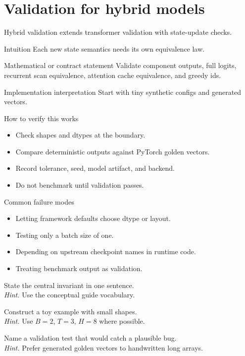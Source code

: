 \chapter{Validation for hybrid models}
\label{ch:hybrid-validation}
Hybrid validation extends transformer validation with state-update checks.



\begin{intuitionbox}{Intuition}
Each new state semantics needs its own equivalence law.
\end{intuitionbox}

\begin{definitionbox}{Mathematical or contract statement}
Validate component outputs, full logits, recurrent scan equivalence, attention cache equivalence, and greedy ids.
\end{definitionbox}

\begin{implementationbox}{Implementation interpretation}
Start with tiny synthetic configs and generated vectors.
\end{implementationbox}

\begin{verificationbox}{How to verify this works}
\begin{itemize}
\item Check shapes and dtypes at the boundary.
\item Compare deterministic outputs against PyTorch golden vectors.
\item Record tolerance, seed, model artifact, and backend.
\item Do not benchmark until validation passes.
\end{itemize}
\end{verificationbox}

\begin{warningbox}{Common failure modes}
\begin{itemize}
\item Letting framework defaults choose dtype or layout.
\item Testing only a batch size of one.
\item Depending on upstream checkpoint names in runtime code.
\item Treating benchmark output as validation.
\end{itemize}
\end{warningbox}

\begin{chapterexercises}
\item State the central invariant in one sentence.\\
\textit{Hint.} Use the conceptual guide vocabulary.
\item Construct a toy example with small shapes.\\
\textit{Hint.} Use $B=2$, $T=3$, $H=8$ where possible.
\item Name a validation test that would catch a plausible bug.\\
\textit{Hint.} Prefer generated golden vectors to handwritten long arrays.
\end{chapterexercises}
